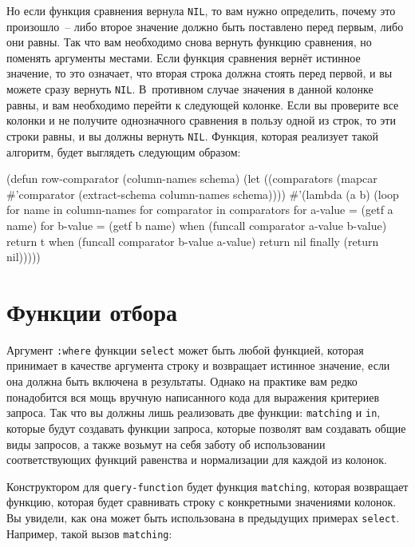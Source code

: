 Но если функция сравнения вернула \lstinline{NIL}, то вам нужно определить, почему это
произошло~-- либо второе значение должно быть поставлено перед первым, либо они равны.  Так
что вам необходимо снова вернуть функцию сравнения, но поменять аргументы мес\-та\-ми.  Если
функция сравнения вернёт истинное значение, то это означает, что вторая строка должна
стоять перед первой, и вы можете сразу вернуть \lstinline{NIL}.  В~противном случае
значения в данной колонке равны, и вам необходимо перейти к следующей колонке.  Если вы
проверите все колонки и не получите однозначного сравнения в пользу одной из строк, то эти
строки равны, и вы должны вернуть \lstinline{NIL}.  Функция, которая реализует такой
алгоритм, будет выглядеть следующим образом:

\begin{myverb}
(defun row-comparator (column-names schema)
  (let ((comparators (mapcar #'comparator (extract-schema column-names schema))))
    #'(lambda (a b)
        (loop
           for name in column-names
           for comparator in comparators
           for a-value = (getf a name)
           for b-value = (getf b name)
           when (funcall comparator a-value b-value) return t
           when (funcall comparator b-value a-value) return nil
           finally (return nil)))))
\end{myverb}

\section{Функции отбора}

Аргумент \lstinline{:where} функции \lstinline{select} может быть любой функцией, которая принимает
в качестве аргумента строку и возвращает истинное значение, если она должна быть включена
в результаты.  Однако на практике вам редко понадобится вся мощь вручную написанного кода
для выражения критериев запроса.  Так что вы должны лишь реализовать две функции:
\lstinline{matching} и \lstinline{in}, которые будут создавать функции запроса, которые позволят вам
создавать общие виды запросов, а также возьмут на себя заботу об использовании
соответствующих функций равенства и нормализации для каждой из колонок.

Конструктором для \lstinline{query-function} будет функция \lstinline{matching}, которая
возвращает функцию, которая будет сравнивать строку с конкретными значениями колонок.  Вы
увидели, как она может быть использована в предыдущих примерах \lstinline{select}.
Например, такой вызов \lstinline{matching}:

